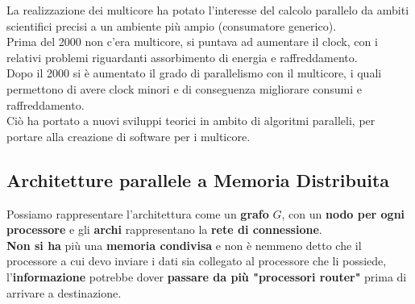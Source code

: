 	La realizzazione dei multicore ha potato l'interesse del calcolo parallelo da ambiti scientifici precisi a un ambiente più ampio (consumatore generico).\\
	
	Prima del 2000 non c'era multicore, si puntava ad aumentare il clock, con i relativi problemi riguardanti assorbimento di energia e raffreddamento.\\
	
	Dopo il 2000 si è aumentato il grado di parallelismo con il multicore, i quali permettono di avere clock minori e di conseguenza migliorare consumi e raffreddamento.\\
	
	Ciò ha portato a nuovi sviluppi teorici in ambito di algoritmi paralleli, per portare alla creazione di software per i multicore.\\
	
	\newpage
	
	\subsection{Architetture parallele a Memoria Distribuita}
	Possiamo rappresentare l'architettura come un \textbf{grafo} $G$, con un \textbf{nodo per ogni processore} e gli \textbf{archi} rappresentano la \textbf{rete di connessione}. \\
	
	\textbf{Non si ha} più una \textbf{memoria condivisa} e non è nemmeno detto che il processore a cui devo inviare i dati sia collegato al processore che li possiede, l'\textbf{informazione} potrebbe dover \textbf{passare da più "processori router"} prima di arrivare a destinazione.
	
